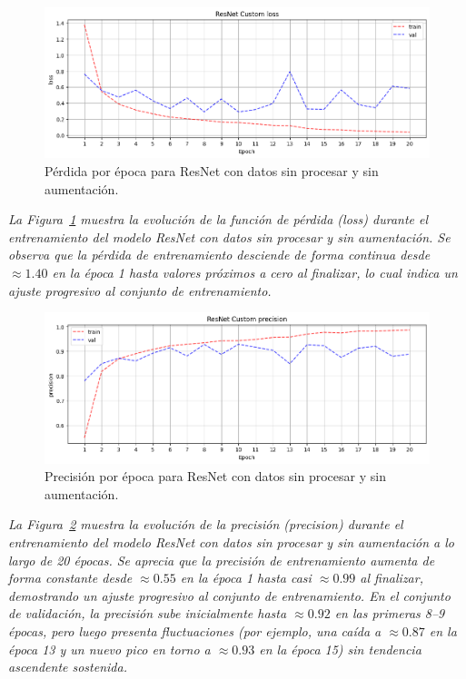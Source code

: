 \documentclass[conference]{IEEEtran}
\begin{document}
\begin{figure}[H]
    \centering
    \includegraphics[width=0.95\linewidth]{graphics-resnet-raw/resnet_raw_without_loss.png}
    \caption{Pérdida por época para ResNet con datos sin procesar y sin aumentación.}
    \label{fig:resnet_raw_without_loss}
\end{figure}
\noindent\textit{%
La Figura~\ref{fig:resnet_raw_without_loss} muestra la evolución de la función de pérdida (loss) durante el entrenamiento del modelo ResNet con datos sin procesar y sin aumentación. Se observa que la pérdida de entrenamiento desciende de forma continua desde \(\approx1.40\) en la época 1 hasta valores próximos a cero al finalizar, lo cual indica un ajuste progresivo al conjunto de entrenamiento.
}

\begin{figure}[H]
    \centering
    \includegraphics[width=0.95\linewidth]{graphics-resnet-raw/resnet_raw_without_precision.png}
    \caption{Precisión por época para ResNet con datos sin procesar y sin aumentación.}
    \label{fig:resnet_raw_without_precision}
\end{figure}
\noindent\textit{%
La Figura~\ref{fig:resnet_raw_without_precision} muestra la evolución de la precisión (precision) durante el entrenamiento del modelo ResNet con datos sin procesar y sin aumentación a lo largo de 20 épocas. Se aprecia que la precisión de entrenamiento aumenta de forma constante desde \(\approx0.55\) en la época 1 hasta casi \(\approx0.99\) al finalizar, demostrando un ajuste progresivo al conjunto de entrenamiento. En el conjunto de validación, la precisión sube inicialmente hasta \(\approx0.92\) en las primeras 8–9 épocas, pero luego presenta fluctuaciones (por ejemplo, una caída a \(\approx0.87\) en la época 13 y un nuevo pico en torno a \(\approx0.93\) en la época 15) sin tendencia ascendente sostenida.
}
\end{document}
